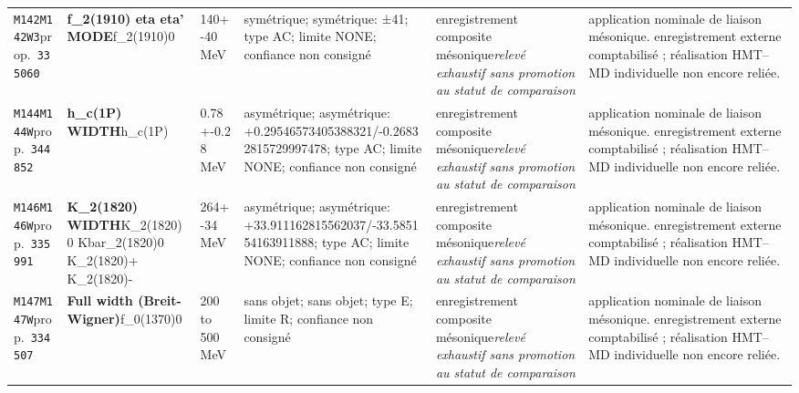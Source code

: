 \begin{landscape}
\begin{longtable}{L{1.85cm}L{4.45cm}L{2.35cm}L{4.05cm}L{3.35cm}L{7.15cm}}
\texttt{M142}\newline \texttt{M142W3}\newline prop.\ \texttt{335060} & \textbf{f\_\allowbreak{}2(1910) eta eta' MODE}\newline f\_\allowbreak{}2(1910)0 & 140+-40\,MeV & symétrique; symétrique: ±41; type AC; limite NONE; confiance non consigné & enregistrement composite mésonique\newline \emph{relevé exhaustif sans promotion au statut de comparaison} & application nominale de liaison mésonique. enregistrement externe comptabilisé ; réalisation HMT--MD individuelle non encore reliée. \\
\texttt{M144}\newline \texttt{M144W}\newline prop.\ \texttt{344852} & \textbf{h\_\allowbreak{}c(1P) WIDTH}\newline h\_\allowbreak{}c(1P) & 0.78+-0.28\,MeV & asymétrique; asymétrique: +0.29546573405388321/-0.26832815729997478; type AC; limite NONE; confiance non consigné & enregistrement composite mésonique\newline \emph{relevé exhaustif sans promotion au statut de comparaison} & application nominale de liaison mésonique. enregistrement externe comptabilisé ; réalisation HMT--MD individuelle non encore reliée. \\
\texttt{M146}\newline \texttt{M146W}\newline prop.\ \texttt{335991} & \textbf{K\_\allowbreak{}2(1820) WIDTH}\newline K\_\allowbreak{}2(1820)0 \textbar{}\allowbreak{} Kbar\_\allowbreak{}2(1820)0 \textbar{}\allowbreak{} K\_\allowbreak{}2(1820)+ \textbar{}\allowbreak{} K\_\allowbreak{}2(1820)- & 264+-34\,MeV & asymétrique; asymétrique: +33.911162815562037/-33.585154163911888; type AC; limite NONE; confiance non consigné & enregistrement composite mésonique\newline \emph{relevé exhaustif sans promotion au statut de comparaison} & application nominale de liaison mésonique. enregistrement externe comptabilisé ; réalisation HMT--MD individuelle non encore reliée. \\
\texttt{M147}\newline \texttt{M147W}\newline prop.\ \texttt{334507} & \textbf{Full width (Breit-Wigner)}\newline f\_\allowbreak{}0(1370)0 & 200 to 500\,MeV & sans objet; sans objet; type E; limite R; confiance non consigné & enregistrement composite mésonique\newline \emph{relevé exhaustif sans promotion au statut de comparaison} & application nominale de liaison mésonique. enregistrement externe comptabilisé ; réalisation HMT--MD individuelle non encore reliée. \\

\end{longtable}
\end{landscape}
